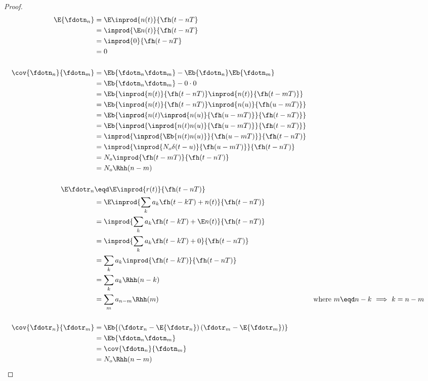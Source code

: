 \begin{proof}
\begin{align*}
   \E{\fdotn_n}
     &=    \E \inprod{n(t)}{\fh(t-nT}
   \\&=    \inprod{\E n(t)}{\fh(t-nT}
   \\&=    \inprod{0}{\fh(t-nT}
   \\&=    0
   \\
   \\
   \cov{\fdotn_n}{\fdotn_m}
     &= \Eb{\fdotn_n \fdotn_m} - \Eb{\fdotn_n}\Eb{\fdotn_m}
   \\&= \Eb{\fdotn_n \fdotn_m} - 0\cdot0
   \\&= \Eb{\inprod{n(t)}{\fh(t-nT)} \inprod{n(t)}{\fh(t-mT)}}
   \\&= \Eb{\inprod{n(t)}{\fh(t-nT)} \inprod{n(u)}{\fh(u-mT)}}
   \\&= \Eb{\inprod{n(t)\inprod{n(u)}{\fh(u-mT)}}{\fh(t-nT)} }
   \\&= \Eb{\inprod{\inprod{n(t)n(u)}{\fh(u-mT)}}{\fh(t-nT)} }
   \\&= \inprod{\inprod{\Eb{n(t)n(u)}}{\fh(u-mT)}}{\fh(t-nT)}
   \\&= \inprod{\inprod{N_o\delta(t-u)}{\fh(u-mT)}}{\fh(t-nT)}
   \\&= N_o \inprod{\fh(t-mT)}{\fh(t-nT)}
   \\&= N_o \Rhh(n-m)
   \\
   \\
   \E\fdotr_n
     &\eqd \E\inprod{r(t)}{\fh(t-nT)}
   \\&=    \E\inprod{\sum_k a_k \fh(t-kT) + n(t)}{\fh(t-nT)}
   \\&=    \inprod{\sum_k a_k \fh(t-kT) + \E n(t)}{\fh(t-nT)}
   \\&=    \inprod{\sum_k a_k \fh(t-kT) + 0}{\fh(t-nT)}
   \\&=    \sum_k a_k \inprod{\fh(t-kT)}{\fh(t-nT)}
   \\&=    \sum_k a_k \Rhh(n-k)
   \\&=    \sum_m a_{n-m} \Rhh(m)  
     && \text{where $m\eqd n-k$ $\implies$ $k=n-m$}
   \\
   \\
   \cov{\fdotr_n}{\fdotr_m}
     &= \Eb{\left(\fdotr_n-\E{\fdotr_n}\right)\left(\fdotr_m-\E{\fdotr_m}\right)}
   \\&= \Eb{\fdotn_n \fdotn_m }
   \\&= \cov{\fdotn_n}{\fdotn_m}
   \\&= N_o \Rhh(n-m)
\end{align*}
\end{proof}


